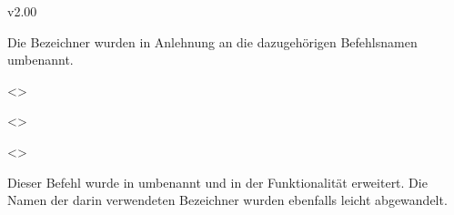 \begin{Cessations}{v2.00}
\begin{Entity}{}
\begin{Cessation}
\begin{Cessation}
\begin{Cessation}
\begin{Cessation}
\begin{Cessation}
\begin{Cessation}
\begin{Cessation}
\begin{Cessation}
\begin{Cessation}
Die Bezeichner wurden in Anlehnung an die dazugehörigen Befehlsnamen umbenannt.
\end{Cessation}
\end{Cessation}
\end{Cessation}
\end{Cessation}
\end{Cessation}
\end{Cessation}
\end{Cessation}
\end{Cessation}
\end{Cessation}

\begin{Cessation}
  {}
  <>
\begin{Cessation}
  {}
  <>
\begin{Cessation}
  {}
  <>
\printdeclarationlist

Dieser Befehl wurde in  umbenannt und in der Funktionalität 
erweitert. Die Namen der darin verwendeten Bezeichner wurden ebenfalls leicht 
abgewandelt.
\end{Cessation}
\end{Cessation}
\end{Cessation}
\end{Entity}
\end{Cessations}



